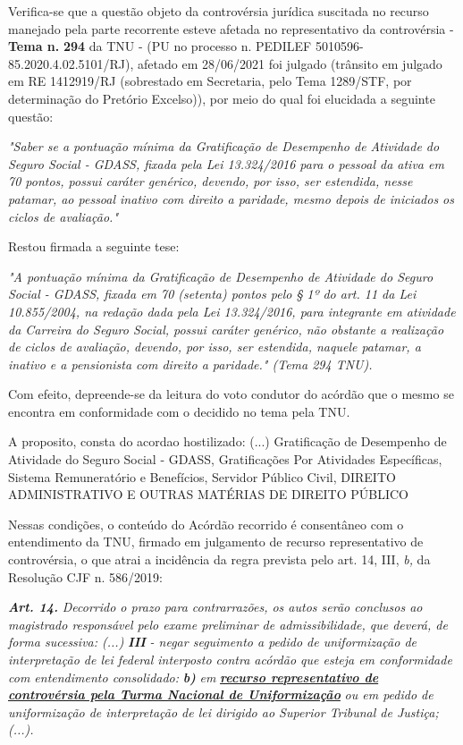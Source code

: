 \documentclass[12pt]{article}
\begin{document}
\justifying
\noindent Verifica-se que a questão objeto da controvérsia jurídica suscitada no recurso manejado pela parte recorrente esteve afetada no representativo da controvérsia - \textbf{Tema n. }\textbf{294} da TNU - (PU no processo n. PEDILEF 5010596-85.2020.4.02.5101/RJ),  afetado em 28/06/2021 foi julgado (trânsito em julgado em RE 1412919/RJ (sobrestado em Secretaria, pelo Tema 1289/STF, por determinação do Pretório Excelso)), por meio do qual foi elucidada a seguinte questão:

\noindent \textit{"Saber se a pontuação mínima da Gratificação de Desempenho de Atividade do Seguro Social - GDASS, fixada pela Lei 13.324/2016 para o pessoal da ativa em 70 pontos, possui caráter genérico, devendo, por isso, ser estendida, nesse patamar, ao pessoal inativo com direito a paridade, mesmo depois de iniciados os ciclos de avaliação."}

\noindent Restou firmada a seguinte tese:

\noindent \textit{"A pontuação mínima da Gratificação de Desempenho de Atividade do Seguro Social - GDASS, fixada em 70 (setenta) pontos pelo § 1º do art. 11 da Lei 10.855/2004, na redação dada pela Lei 13.324/2016, para integrante em atividade da Carreira do Seguro Social, possui caráter genérico, não obstante a realização de ciclos de avaliação, devendo, por isso, ser estendida, naquele patamar, a inativo e a pensionista com direito a paridade." (Tema 294 TNU).}

\noindent Com efeito, depreende-se da leitura do voto condutor do acórdão que o mesmo se encontra em conformidade com o decidido no  tema pela TNU.

\noindent A proposito, consta do acordao hostilizado: (...) Gratificação de Desempenho de Atividade do Seguro Social - GDASS, Gratificações Por Atividades Específicas, Sistema Remuneratório e Benefícios, Servidor Público Civil, DIREITO ADMINISTRATIVO E OUTRAS MATÉRIAS DE DIREITO PÚBLICO

\noindent Nessas condições, o conteúdo do Acórdão recorrido é consentâneo com o entendimento da TNU, firmado em julgamento de recurso representativo de controvérsia, o que atrai a incidência da regra prevista pelo art. 14, III, \textit{b,} da Resolução CJF n. 586/2019:

\noindent \textit{\textbf{Art. 14.}}\textit{ Decorrido o prazo para contrarrazões, os autos serão conclusos ao magistrado responsável pelo exame preliminar de admissibilidade, que deverá, de forma sucessiva: (...) }\textit{\textbf{III }}\textit{- negar seguimento a pedido de uniformização de interpretação de lei federal interposto contra acórdão que esteja em conformidade com entendimento consolidado: }\textit{\textbf{b)}}\textit{ em }\uline{\textit{\textbf{recurso representativo de controvérsia pela Turma Nacional de Uniformização}}}\textit{ ou em pedido de uniformização de interpretação de lei dirigido ao Superior Tribunal de Justiça;(...).}
\end{document}
